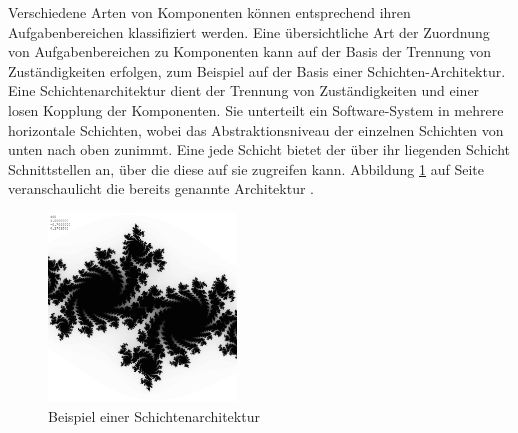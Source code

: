 Verschiedene Arten von Komponenten können entsprechend ihren Aufgabenbereichen klassifiziert werden. Eine übersichtliche Art der Zuordnung von Aufgabenbereichen zu Komponenten kann auf der Basis der Trennung von Zuständigkeiten erfolgen, zum Beispiel auf der Basis einer Schichten-Architektur. Eine Schichtenarchitektur dient der Trennung von Zuständigkeiten und einer losen Kopplung der Komponenten. Sie unterteilt ein Software-System in mehrere horizontale Schichten, wobei das Abstraktionsniveau der einzelnen Schichten von unten nach oben zunimmt. Eine jede Schicht bietet der über ihr liegenden Schicht Schnittstellen an, über die diese auf sie zugreifen kann. Abbildung \ref{fig:2_Schichtenarchitektur} auf Seite \pageref{fig:2_Schichtenarchitektur} veranschaulicht die bereits genannte Architektur \citereset \autocite{Andresen.2003}.
\begin{figure}[h]
\centering
\includegraphics[height=5.0cm]{images/Julia-Fractal.png}
\caption[
Beispiel einer Schichtenarchitektur, Urldate: 04.2014 \newline
\small\texttt{http://upload.wikimedia.org/wikipedia/commons/e/e1/SchichtenarchitekturAufrufstrukturen.svg}
]{Beispiel einer Schichtenarchitektur}
\label{fig:2_Schichtenarchitektur}
\end{figure}





